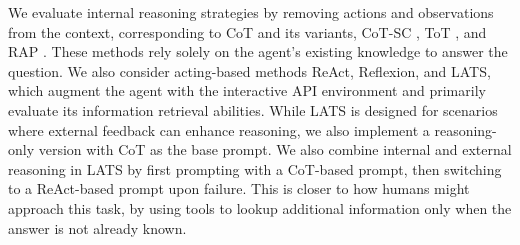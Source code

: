 \documentclass{article} \usepackage{iclr2024_conference,times}
\begin{document}
We evaluate internal reasoning strategies by removing actions and observations from the context, corresponding to CoT \citep{wei2022chain} and its variants, CoT-SC \citep{wang2022self}, ToT \citep{yao2023tree}, and RAP \citep{hao2023reasoning}. These methods rely solely on the agent's existing knowledge to answer the question. We also consider acting-based methods ReAct, Reflexion, and LATS, which augment the agent with the interactive API environment and primarily evaluate its information retrieval abilities. While LATS is designed for scenarios where external feedback can enhance reasoning, we also implement a reasoning-only version with CoT as the base prompt. We also combine internal and external reasoning in LATS by first prompting with a CoT-based prompt, then switching to a ReAct-based prompt upon failure. This is closer to how humans might approach this task, by using tools to lookup additional information only when the answer is not already known. 
\end{document}
